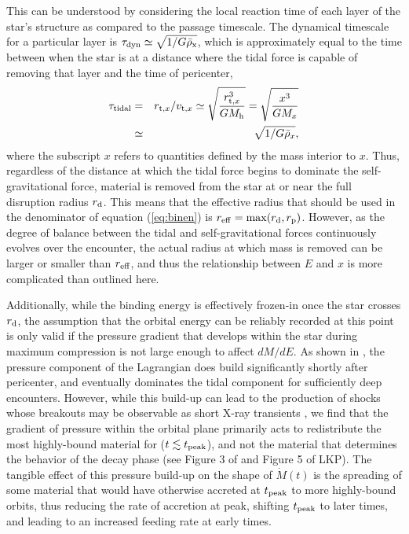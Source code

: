 \documentclass[twocolumn]{emulateapj}
\newcommand{\dmde}{dM/dE}
\newcommand{\md}{\dot{M}\left(t\right)}
\newcommand{\tpeak}{t_{\rm peak}}
\newcommand{\mh}{M_{\rm h}}
\newcommand{\lodato}{LKP\xspace}
\begin{document}
This can be understood by considering the local reaction time of each layer of the star's structure as compared to the passage timescale. The dynamical timescale for a particular layer is $\tau_{\rm dyn} \simeq \sqrt{1/G \bar{\rho}_{\rm x}}$, which is approximately equal to the time between when the star is at a distance where the tidal force is capable of removing that layer and the time of pericenter,
\begin{eqnarray}
\tau_{\rm tidal} &=& r_{{\rm t},x}/v_{{\rm t},x} \simeq \sqrt{\frac{r_{{\rm t},x}^{3}}{G \mh}} = \sqrt{\frac{x^{3}}{G M_{x}}}\\
&\simeq& \sqrt{1/G\bar{\rho}_{x}},
\end{eqnarray}
where the subscript $x$ refers to quantities defined by the mass interior to $x$. Thus, regardless of the distance at which the tidal force begins to dominate the self-gravitational force, material is removed from the star at or near the full disruption radius $r_{\rm d}$. This means that the effective radius that should be used in the denominator of equation (\ref{eq:binen}) is $r_{\rm eff} =\max(r_{\rm d}, r_{\rm p})$. However, as the degree of balance between the tidal and self-gravitational forces continuously evolves over the encounter, the actual radius at which mass is removed can be larger or smaller than $r_{\rm eff}$, and thus the relationship between $E$ and $x$ is more complicated than outlined here.

Additionally, while the binding energy is effectively frozen-in once the star crosses $r_{\rm d}$, the assumption that the orbital energy can be reliably recorded at this point is only valid if the pressure gradient that develops within the star during maximum compression is not large enough to affect $\dmde$. As shown in \cite{Carter:1983tz}, the pressure component of the Lagrangian does build significantly shortly after pericenter, and eventually dominates the tidal component for sufficiently deep encounters. However, while this build-up can lead to the production of shocks whose breakouts may be observable as short X-ray transients \citep{Guillochon:2009di}, we find that the gradient of pressure within the orbital plane primarily acts to redistribute the most highly-bound material for ($t \lesssim \tpeak$), and not the material that determines the behavior of the decay phase 
(see Figure 3 of \citeauthor{Guillochon:2009di} and Figure 5 of \lodato). The tangible effect of this pressure build-up on the shape of $\md$ is the spreading of some material that would have otherwise accreted at $\tpeak$ to more highly-bound orbits, thus reducing the rate of accretion at peak, shifting $\tpeak$ to later times, and leading to an increased feeding rate at early times.
\end{document}
